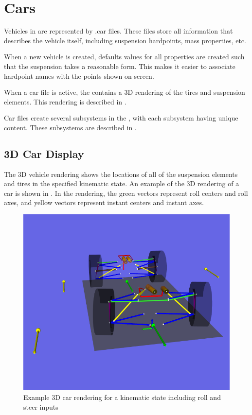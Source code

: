 \chapter{Cars} \label{ch:cars}

Vehicles in \vvase{} are represented by .car files.  These files store all information that describes the vehicle itself, including suspension hardpoints, mass properties, etc.

When a new vehicle is created, defaults values for all properties are created such that the suspension takes a reasonable form.  This makes it easier to associate hardpoint names with the points shown on-screen.

When a car file is active, the  contains a 3D rendering of the tires and suspension elements.  This rendering is described in .

Car files create several subsystems in the , with each subsystem having unique  content.  These subsystems are described in .

\section{3D Car Display} \label{sec:3dCarDisplay}

The 3D vehicle rendering shows the locations of all of the suspension elements and tires in the specified kinematic state.  An example of the 3D rendering of a car is shown in .  In the rendering, the green vectors represent roll centers and roll axes, and yellow vectors represent instant centers and instant axes.

\begin{figure}
  \includegraphics[width=\textwidth]{images/car}
  \caption{Example 3D car rendering for a kinematic state including roll and steer inputs} \label{fig:car}
  \centering
\end{figure}

